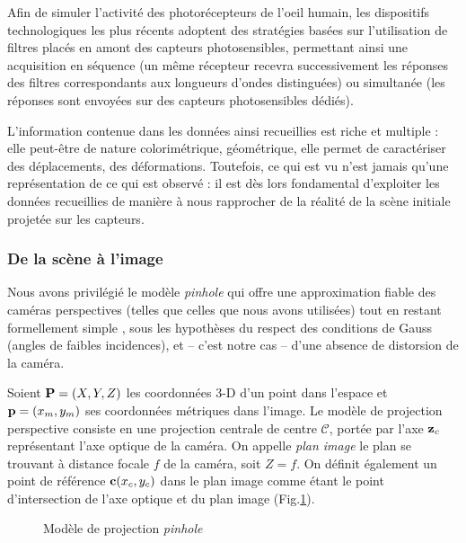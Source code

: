 Afin de simuler l'activité des photorécepteurs de l'oeil humain, les 
dispositifs technologiques les plus récents adoptent des stratégies basées sur 
l'utilisation de filtres placés en amont des capteurs photosensibles, 
permettant 
ainsi une acquisition en séquence (un même récepteur recevra successivement les 
réponses des filtres correspondants aux longueurs d'ondes distinguées) ou 
simultanée (les réponses sont envoyées sur des capteurs photosensibles dédiés).
  
L'information contenue dans les données ainsi recueillies est riche et multiple 
: elle peut-être de nature colorimétrique, géométrique, elle permet de 
ca\-ractériser des déplacements, des déformations. Toutefois, ce qui est vu 
n'est jamais qu'une représentation de ce qui est observé : il est d\`es lors 
fondamental d'exploiter les donn\'ees recueillies de mani\`ere \`a nous 
rapprocher de la r\'ealit\'e de la scène initiale projetée sur les capteurs.
 
\subsubsection{De la scène à l'image} \label{chap0-3-0-1}

Nous avons privilégié le modèle {\it pinhole} qui offre une approximation 
fiable des caméras perspectives (telles que celles que nous avons utilisées) 
tout en restant formellement simple\cite{Faugeras:1993} \cite{hartley2004}, sous 
les hypothèses du respect des conditions de Gauss (angles de faibles 
incidences), et -- c'est notre cas -- d'une absence de distorsion de la caméra.

Soient ${\bf P} = (X, Y, Z)$ les coordonnées 3-D d'un point dans l'espace et 
${\bf p} = (x_m, y_m)$ ses coordonnées m\'etriques dans l'image. Le modèle de 
projection perspective consiste en une projection centrale de centre $\mathcal 
C$, portée par l'axe ${\bf z}_c$ représentant l'axe optique de la caméra. On 
appelle {\it plan image} le plan se trouvant à distance focale $f$ de la 
caméra, 
soit $Z = f$. On définit également un point de référence ${\bf c}(x_c,y_c)$ 
dans 
le plan image comme étant le point d'intersection de l'axe optique et du plan 
image (Fig.\ref{intro:fig12}).

\begin{figure}[h!tp]
  \centering
  \def\svgwidth{.95\linewidth}
  
    \caption{\footnotesize{Modèle de projection {\it pinhole}}}
\label{intro:fig12}
\end{figure}

